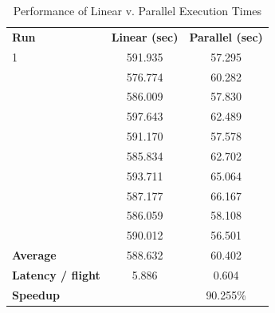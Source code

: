     
    \begin{table}[tb]
    	\centering
        \caption{\small{Performance of Linear v. Parallel Execution Times}} \label{tab:performance_results}
        \vspace{3pt}
        \begin{tabular}{@{} >{\centering\arraybackslash} m{.23\linewidth} S[table-format=3.3] S[table-format=2.3] @{}}
            \hline\noalign{\smallskip}
            \bfseries Run & \bfseries Linear (sec) & \bfseries Parallel (sec) \\
            \noalign{\smallskip}
            \hline
            \noalign{\smallskip}
             1 & 591.935 & 57.295 \\  & 576.774 & 60.282 \\  & 586.009 & 57.830 \\  & 597.643 & 62.489 \\  & 591.170 & 57.578 \\  & 585.834 & 62.702 \\  & 593.711 & 65.064 \\  & 587.177 & 66.167 \\  & 586.059 & 58.108 \\  & 590.012 & 56.501 \\ \hline
            \hline
            \bfseries Average           & 588.632 & 60.402   \\ \hline
            \bfseries Latency / flight  &   5.886 &  0.604   \\ \hline
            \bfseries Speedup           &         & 90.255\% \\ \hline
        \end{tabular}
    \end{table}
    
    
    
    